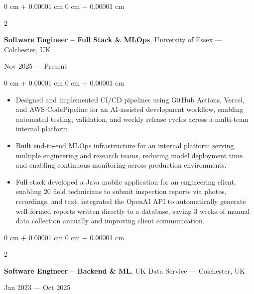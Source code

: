 \documentclass[6pt, letterpaper]{article}
\newenvironment{highlights}{
    \begin{itemize}[
        topsep=0.03 cm,
        parsep=0.03 cm,
        partopsep=0pt,
        itemsep=0pt,
        leftmargin=0 cm + 10pt
    ]
}{
    \end{itemize}
} %
\newenvironment{onecolentry}{
    \begin{adjustwidth}{
        0 cm + 0.00001 cm
    }{
        0 cm + 0.00001 cm
    }
}{
    \end{adjustwidth}
} %
\newenvironment{twocolentry}[2][]{
    \onecolentry
    \def\secondColumn{#2}
    \setcolumnwidth{\fill, 4.5 cm}
    \begin{paracol}{2}
}{
    \switchcolumn \raggedleft \secondColumn
    \end{paracol}
    \endonecolentry
} %
\begin{document}
        \begin{twocolentry}{Nov 2025 --- Present}
            \textbf{Software Engineer – Full Stack \& MLOps}, University of Essex --- Colchester, UK
        \end{twocolentry}

        \begin{onecolentry}
        \begin{highlights}

            \item Designed and implemented CI/CD pipelines using GitHub Actions, Vercel, and AWS CodePipeline for an AI-assisted development workflow, enabling automated testing, validation, and weekly release cycles across a multi-team internal platform.
            \item Built end-to-end MLOps infrastructure for an internal platform serving multiple engineering and research teams, reducing model deployment time and enabling continuous monitoring across production environments.
            \item Full-stack developed a Java mobile application for an engineering client, enabling 20 field technicians to submit inspection reports via photos, recordings, and text; integrated the OpenAI API to automatically generate well-formed reports written directly to a database, saving 3 weeks of manual data collection annually and improving client communication.

        \end{highlights}
        \end{onecolentry}

        \begin{twocolentry}{Jan 2023 --- Oct 2025}
            \textbf{Software Engineer – Backend \& ML}, UK Data Service --- Colchester, UK
        \end{twocolentry}
\end{document}
